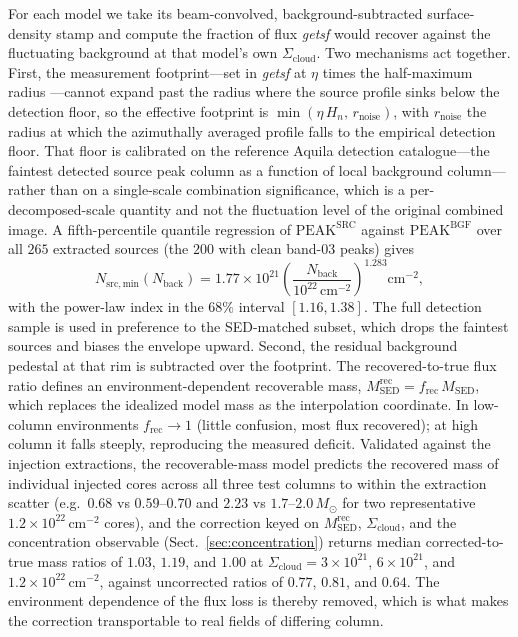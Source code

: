 \documentclass[11pt,a4paper]{article}
\newcommand{\msun}{M_{\odot}}
\newcommand{\Scloud}{\Sigma_{\mathrm{cloud}}}
\begin{document}
For each model we take its beam-convolved, background-subtracted
surface-density stamp and compute the fraction of flux \emph{getsf} would
recover against the fluctuating background at that model's own $\Scloud$. Two
mechanisms act together. First, the measurement footprint---set in
\emph{getsf} at $\eta$ times the half-maximum radius \citep{Menshchikov2021}
---cannot expand past the radius where the source profile sinks below the
detection floor, so the effective footprint is
$\min(\eta\,H_n,\,r_{\mathrm{noise}})$, with $r_{\mathrm{noise}}$ the radius at
which the azimuthally averaged profile falls to the empirical detection floor.
That floor is calibrated on the reference Aquila detection catalogue---the
faintest detected source peak column as a function of local background
column---rather than on a single-scale combination significance, which is a
per-decomposed-scale quantity and not the fluctuation level of the original
combined image. A fifth-percentile quantile regression of $\mathrm{PEAK^{SRC}}$
against $\mathrm{PEAK^{BGF}}$ over all $265$ extracted sources (the $200$ with
clean band-03 peaks) gives
\begin{equation}
  N_{\mathrm{src,min}}(N_{\mathrm{back}}) = 1.77\times10^{21}
  \left(\frac{N_{\mathrm{back}}}{10^{22}\,\mathrm{cm^{-2}}}\right)^{1.283}
  \mathrm{cm^{-2}},
  \label{eq:floor}
\end{equation}
with the power-law index in the $68\%$ interval $[1.16,1.38]$. The full
detection sample is used in preference to the SED-matched subset, which drops
the faintest sources and biases the envelope upward. Second, the residual
background pedestal at that rim is subtracted over the footprint.
The recovered-to-true flux ratio defines an environment-dependent recoverable
mass, $M_{\mathrm{SED}}^{\mathrm{rec}}=f_{\mathrm{rec}}\,M_{\mathrm{SED}}$,
which replaces the idealized model mass as the interpolation coordinate. In
low-column environments $f_{\mathrm{rec}}\to 1$ (little confusion, most flux
recovered); at high column it falls steeply, reproducing the measured deficit.
Validated against the injection extractions, the recoverable-mass model
predicts the recovered mass of individual injected cores across all three test
columns to within the extraction scatter (e.g.\ $0.68$ vs $0.59$--$0.70$ and
$2.23$ vs $1.7$--$2.0\,\msun$ for two representative
$1.2\times10^{22}\,\mathrm{cm^{-2}}$ cores), and the correction keyed on
$M_{\mathrm{SED}}^{\mathrm{rec}}$, $\Scloud$, and the concentration observable
(Sect.~\ref{sec:concentration}) returns median corrected-to-true mass ratios
of $1.03$, $1.19$, and $1.00$ at $\Scloud=3\times10^{21}$,
$6\times10^{21}$, and $1.2\times10^{22}\,\mathrm{cm^{-2}}$, against uncorrected
ratios of $0.77$, $0.81$, and $0.64$. The environment dependence of the flux
loss is thereby removed, which is what makes the correction transportable to
real fields of differing column.
\end{document}
